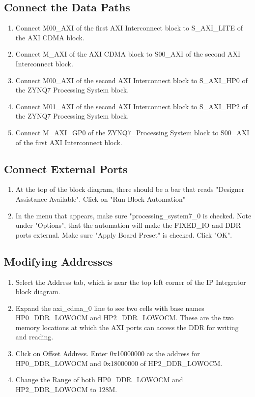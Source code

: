 \documentclass[12pt]{article}
\begin{document}
\subsection{Connect the Data Paths}
\begin{enumerate}
\item Connect M00\_AXI of the first AXI Interconnect block to S\_AXI\_LITE of the AXI CDMA block.
\item Connect M\_AXI of the AXI CDMA block to S00\_AXI of the second AXI Interconnect block.
\item Connect M00\_AXI of the second AXI Interconnect block to S\_AXI\_HP0 of the ZYNQ7 Processing System block.
\item Connect M01\_AXI of the second AXI Interconnect block to S\_AXI\_HP2 of the ZYNQ7 Processing System block.
\item Connect M\_AXI\_GP0 of the ZYNQ7\_Processing System block to S00\_AXI of the first AXI Interconnect block.
\end{enumerate}

\subsection{Connect External Ports}
\begin{enumerate}
\item At the top of the block diagram, there should be a bar that reads "Designer Assistance Available".  Click on "Run Block Automation"
\item In the menu that appears, make sure "processing\_system7\_0 is checked.  Note under "Options", that the automation will make the FIXED\_IO and DDR ports external.  Make sure "Apply Board Preset" is checked.  Click "OK".
\end{enumerate}

\subsection{Modifying Addresses}
\begin{enumerate}
\item Select the Address tab, which is near the top left corner of the IP Integrator block diagram.
\item Expand the axi\_cdma\_0 line to see two cells with base names HP0\_DDR\_LOWOCM and HP2\_DDR\_LOWOCM.   These are the two memory locations at which the AXI ports can access the DDR for writing and reading.
\item Click on Offset Address.  Enter 0x10000000 as the address for HP0\_DDR\_LOWOCM and 0x18000000 of HP2\_DDR\_LOWOCM.
\item Change the Range of both HP0\_DDR\_LOWOCM and HP2\_DDR\_LOWOCM to 128M.
\end{enumerate}
\end{document}
